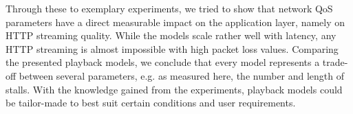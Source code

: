 Through these to exemplary experiments, we tried to show that network QoS parameters have a direct measurable impact on the application layer, namely on HTTP streaming quality. While the models scale rather well with latency, any HTTP streaming is almost impossible with high packet loss values.
Comparing the presented playback models, we conclude that every model represents a trade-off between several parameters, e.g. as measured here, the number and length of stalls. With the knowledge gained from the experiments, playback models could be tailor-made to best suit certain conditions and user requirements. 



	
